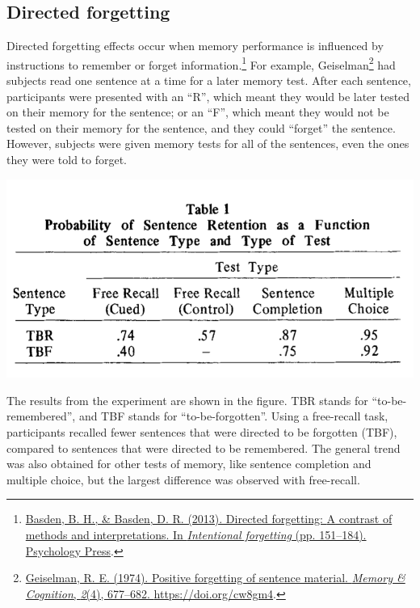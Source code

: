\documentclass[
  oneside,
  12pt]{crumpbook}
\newenvironment{floatright50}{%
  \wrapfigure{R}{.5\textwidth}%
  }{%
  \endwrapfigure}
\begin{document}
\hypertarget{directed-forgetting}{%
\subsection{Directed forgetting}\label{directed-forgetting}}

Directed forgetting effects occur when memory performance is influenced by instructions to remember or forget information.\footnote{\protect\hyperlink{ref-basdenDirectedForgettingContrast2013}{Basden, B. H., \& Basden, D. R. (2013). Directed forgetting: {A} contrast of methods and interpretations. In \emph{Intentional forgetting} (pp. 151--184). {Psychology Press}}.} For example, Geiselman\footnote{\protect\hyperlink{ref-geiselmanPositiveForgettingSentence1974}{Geiselman, R. E. (1974). Positive forgetting of sentence material. \emph{Memory \& Cognition}, \emph{2}(4), 677--682. \url{https://doi.org/cw8gm4}}.} had subjects read one sentence at a time for a later memory test. After each sentence, participants were presented with an ``R'', which meant they would be later tested on their memory for the sentence; or an ``F'', which meant they would not be tested on their memory for the sentence, and they could ``forget'' the sentence. However, subjects were given memory tests for all of the sentences, even the ones they were told to forget.

\begin{floatright50}
\includegraphics[width=1\linewidth]{imgs/Direct_forgetting}

\end{floatright50}

The results from the experiment are shown in the figure. TBR stands for ``to-be-remembered'', and TBF stands for ``to-be-forgotten''. Using a free-recall task, participants recalled fewer sentences that were directed to be forgotten (TBF), compared to sentences that were directed to be remembered. The general trend was also obtained for other tests of memory, like sentence completion and multiple choice, but the largest difference was observed with free-recall.
\end{document}
